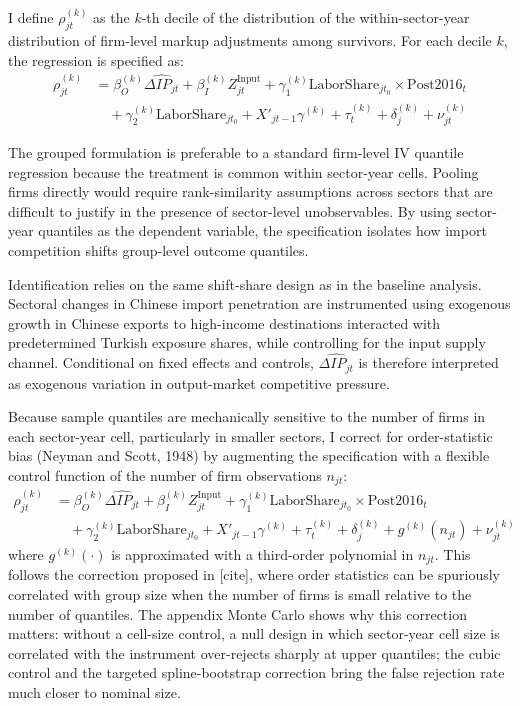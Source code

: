 \documentclass[12pt]{article}
\newcommand{\textcite}[2][]{[cite]}
\begin{document}
I define $\rho_{jt}^{(k)}$ as the $k$-th decile of the distribution of the within-sector-year distribution of firm-level markup adjustments among survivors. For each decile $k$, the regression is specified as:
\begin{equation}
\begin{aligned}
\rho_{jt}^{(k)} &= \beta_O^{(k)} \widehat{\Delta IP_{jt}} + \beta_I^{(k)} Z_{jt}^{\text{Input}} + \gamma_1^{(k)} \text{LaborShare}_{jt_0} \times \text{Post2016}_t \\
&\quad + \gamma_2^{(k)} \text{LaborShare}_{jt_0} + X'_{jt-1} \gamma^{(k)} + \tau_t^{(k)} + \delta_j^{(k)} + \nu_{jt}^{(k)}
\end{aligned}
\end{equation}

The grouped formulation is preferable to a standard firm-level IV quantile regression because the treatment is common within sector-year cells. Pooling firms directly would require rank-similarity assumptions across sectors that are difficult to justify in the presence of sector-level unobservables. By using sector-year quantiles as the dependent variable, the specification isolates how import competition shifts group-level outcome quantiles.

Identification relies on the same shift-share design as in the baseline analysis. Sectoral changes in Chinese import penetration are instrumented using exogenous growth in Chinese exports to high-income destinations interacted with predetermined Turkish exposure shares, while controlling for the input supply channel. Conditional on fixed effects and controls, $\widehat{\Delta IP_{jt}}$ is therefore interpreted as exogenous variation in output-market competitive pressure. 

Because sample quantiles are mechanically sensitive to the number of firms in each sector-year cell, particularly in smaller sectors, I correct for order-statistic bias (Neyman and Scott, 1948) by augmenting the specification with a flexible control function of the number of firm observations $n_{jt}$:
\begin{equation}
\begin{aligned}
\rho_{jt}^{(k)} &= \beta_O^{(k)} \widehat{\Delta IP_{jt}} + \beta_I^{(k)} Z_{jt}^{\text{Input}} + \gamma_1^{(k)} \text{LaborShare}_{jt_0} \times \text{Post2016}_t \\
&\quad + \gamma_2^{(k)} \text{LaborShare}_{jt_0} + X'_{jt-1} \gamma^{(k)} + \tau_t^{(k)} + \delta_j^{(k)} + g^{(k)}(n_{jt}) + \nu_{jt}^{(k)}
\end{aligned}
\end{equation}
where $g^{(k)}(\cdot)$ is approximated with a third-order polynomial in $n_{jt}$. This follows the correction proposed in \textcite{backusWhyProductivityCorrelated2020}, where order statistics can be spuriously correlated with group size when the number of firms is small relative to the number of quantiles. The appendix Monte Carlo shows why this correction matters: without a cell-size control, a null design in which sector-year cell size is correlated with the instrument over-rejects sharply at upper quantiles; the cubic control and the targeted spline-bootstrap correction bring the false rejection rate much closer to nominal size.
\end{document}
